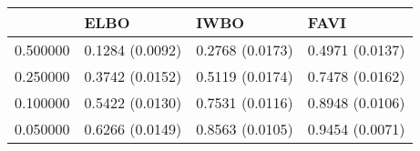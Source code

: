 \begin{tabular}{llll}
\toprule
 & ELBO & IWBO & FAVI \\
\midrule
0.500000 & 0.1284 (0.0092) & 0.2768 (0.0173) & 0.4971 (0.0137) \\
0.250000 & 0.3742 (0.0152) & 0.5119 (0.0174) & 0.7478 (0.0162) \\
0.100000 & 0.5422 (0.0130) & 0.7531 (0.0116) & 0.8948 (0.0106) \\
0.050000 & 0.6266 (0.0149) & 0.8563 (0.0105) & 0.9454 (0.0071) \\
\bottomrule
\end{tabular}

